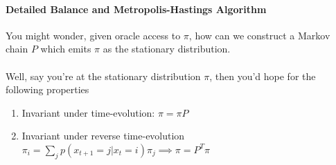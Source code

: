 \paragraph{Detailed Balance and Metropolis-Hastings Algorithm}
You might wonder, given oracle access to $\pi$, how can we construct a Markov chain $P$ which emits $\pi$ as the stationary distribution. \\
\\
Well, say you're at the stationary distribution $\pi$, then you'd hope for the following properties
\begin{enumerate}
	\item Invariant under time-evolution: $\pi = \pi P$
	\item Invariant under reverse time-evolution $\pi_i = \sum_j p(x_{t+1} = j | x_{t} = i) \pi_j \implies \pi = P^T \pi$
\end{enumerate}

